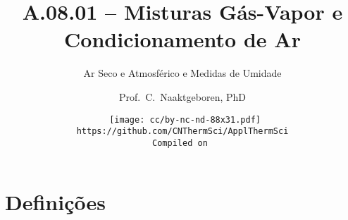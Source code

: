 \makeatletter
\immediate{} %
\makeatother



\title{A.08.01 -- Misturas Gás-Vapor e Condicionamento de Ar}
\subtitle{Ar Seco e Atmosférico e Medidas de Umidade}
\author{Prof.~C.~Naaktgeboren, PhD}
\date{{\scriptsize\tt%
    \texttt{[image: cc/by-nc-nd-88x31.pdf]}\\[\smallskipamount]
    https://github.com/CNThermSci/ApplThermSci\\
    Compiled on 
}}

\frame{\titlepage}

\frame{\tableofcontents}

\section{Definições}

